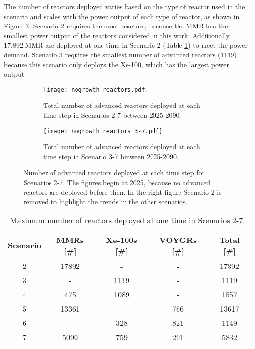The number of reactors deployed varies based on 
the type of reactor used in the scenario and scales with the power output of 
each type of reactor, as shown in Figure \ref{fig:nogrowth_reactors}. Scenario
2 requires the most reactors, because the \gls{MMR} has the smallest power 
output of the reactors considered in this work. Additionally, 17,892
\gls{MMR} are deployed 
at one time in Scenario 2 (Table \ref{tab:reactors_nogrowth}) to meet the 
power demand. Scenario 3 requires the smallest number of advanced reactors 
(1119) because this scenario only deploys the Xe-100, which
has the largest power output. 

\begin{figure}
    \centering
    \begin{subfigure}[b]{0.45\textwidth}
        \centering
        \texttt{[image: nogrowth\_reactors.pdf]}
        \caption{Total number of advanced reactors deployed at 
        each time step in Scenarios 2-7 between 2025-2090.}
        \label{fig:nogrowth_reactors_all}
    \end{subfigure}
    \hfill
    \begin{subfigure}[b]{0.45\textwidth}
        \centering
        \texttt{[image: nogrowth\_reactors\_3-7.pdf]}
        \caption{Total number of advanced reactors deployed at 
        each time step in Scenario 3-7 between 2025-2090.}
        \label{fig:nogrowth_reactors_3-7}
    \end{subfigure}
       \caption{Number of advanced reactors deployed at each time step 
       for Scenarios 2-7. The figures begin at 2025, because no advanced 
       reactors are deployed before then. In the right figure Scenario 
       2 is removed to highlight the trends in the other scenarios.}
       \label{fig:nogrowth_reactors}
\end{figure}

\begin{table}
    \centering 
    \caption{Maximum number of reactors deployed at one time in 
    Scenarios 2-7.}
    \label{tab:reactors_nogrowth}
    \begin{tabular}{c c c c c}
        \hline
        Scenario & \glspl{MMR} [\#] & Xe-100s [\#] & VOYGRs [\#] 
        & Total [\#]\\\hline
        2 & 17892 & - & - & 17892\\
        3 & - & 1119 & - & 1119\\
        4 & 475 & 1089 & - & 1557\\
        5 & 13361 & - & 766 & 13617\\
        6 & - & 328 & 821 & 1149\\
        7 & 5090 & 759 & 291 & 5832\\
        \hline
    \end{tabular}
\end{table}


